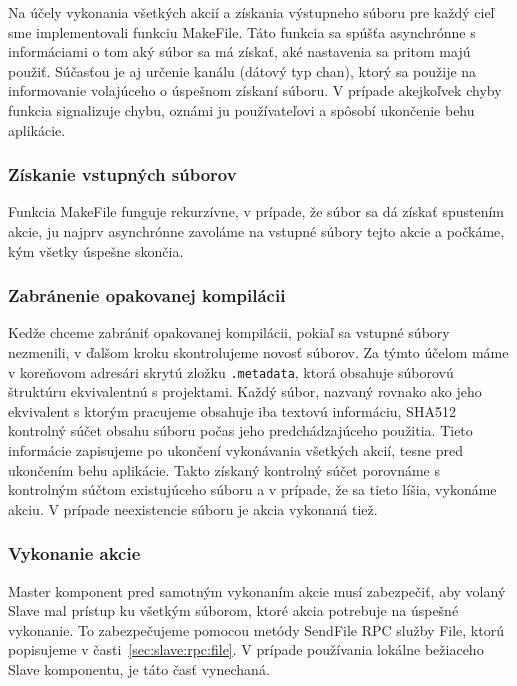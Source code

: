 Na účely vykonania všetkých akcií a získania výstupneho súboru pre každý cieľ sme
implementovali funkciu MakeFile. Táto funkcia sa spúšťa asynchrónne s informáciami
o tom aký súbor sa má získať, aké nastavenia sa pritom majú použiť. Súčasťou je
aj určenie kanálu (dátový typ chan), ktorý sa použije na informovanie volajúceho
o úspešnom získaní súboru. V prípade akejkoľvek chyby funkcia signalizuje chybu,
oznámi ju používateľovi a spôsobí ukončenie behu aplikácie.

\subsubsection{Získanie vstupných súborov}

Funkcia MakeFile funguje rekurzívne, v prípade, že súbor sa dá získať spustením akcie, ju
najprv asynchrónne zavoláme na vstupné súbory tejto akcie a počkáme, kým všetky
úspešne skončia.

\subsubsection{Zabránenie opakovanej kompilácii}

Kedže chceme zabrániť opakovanej kompilácii, pokiaľ sa vstupné súbory nezmenili,
v ďalšom kroku skontrolujeme novosť súborov. Za týmto účelom máme v koreňovom
adresári skrytú zložku \texttt{.metadata}, ktorá obsahuje súborovú štruktúru
ekvivalentnú s projektami. Každý súbor, nazvaný rovnako ako jeho ekvivalent s ktorým
pracujeme obsahuje iba textovú informáciu, SHA512 kontrolný súčet obsahu súboru
počas jeho predchádzajúceho použitia. Tieto informácie zapisujeme po ukončení vykonávania
všetkých akcií, tesne pred ukončením behu aplikácie. Takto získaný kontrolný súčet
porovnáme s kontrolným súčtom existujúceho súboru a v prípade, že sa tieto líšia,
vykonáme akciu. V prípade neexistencie súboru je akcia vykonaná tiež.

\subsubsection{Vykonanie akcie}

Master komponent pred samotným vykonaním akcie musí zabezpečiť, aby volaný Slave
mal prístup ku všetkým súborom, ktoré akcia potrebuje na úspešné vykonanie. To
zabezpečujeme pomocou metódy SendFile RPC služby File, ktorú popisujeme v časti~\ref{sec:slave:rpc:file}.
V prípade používania lokálne bežiaceho Slave komponentu, je táto časť vynechaná.

